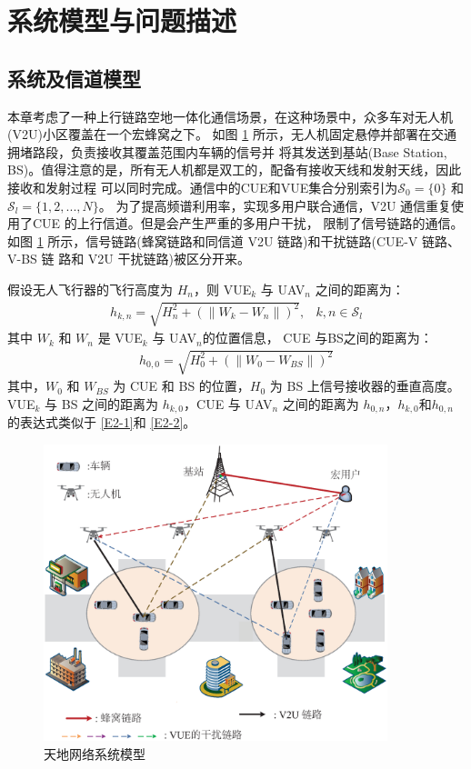 \section{系统模型与问题描述}\label{section2-2}
\subsection{系统及信道模型}\label{section2-2-1}
本章考虑了一种上行链路空地一体化通信场景，在这种场景中，众多车对无人机(V2U)小区覆盖在一个宏蜂窝之下。
如图 \ref{天地网络系统模型} 所示，无人机固定悬停并部署在交通拥堵路段，负责接收其覆盖范围内车辆的信号并
将其发送到基站(Base Station, BS)。值得注意的是，所有无人机都是双工的，配备有接收天线和发射天线，因此接收和发射过程
可以同时完成。通信中的CUE和VUE集合分别索引为$\mathcal{S}_0= \{0\}$ 和$\mathcal{S}_l=\{1, 2,..., N\}$。
为了提高频谱利用率，实现多用户联合通信，V2U 通信重复使用了CUE 的上行信道。但是会产生严重的多用户干扰，
限制了信号链路的通信。如图 \ref{天地网络系统模型} 所示，信号链路(蜂窝链路和同信道 V2U 链路)和干扰链路(CUE-V 链路、V-BS 链
路和 V2U 干扰链路)被区分开来。

假设无人飞行器的飞行高度为 $H_n$，则 VUE$_{k}$ 与 UAV$_{n}$ 之间的距离为：
\begin{eqnarray}\label{E2-1}
h_{k,n}=\sqrt{H_n^2+(\|W_k-W_n\|)^2},           &k, n\in \mathcal{S}_l
\end{eqnarray}
其中 $W_k$ 和 $W_n$ 是 VUE$_{k}$ 与 UAV$_{n}$的位置信息，  CUE 与BS之间的距离为：
\begin{eqnarray}\label{E2-2}
h_{0,0}=\sqrt{H_0^2+(\|W_0-W_{BS}\|)^2}
\end{eqnarray}
其中，$W_0$ 和 $W_{BS}$ 为 CUE 和 BS 的位置，$H_0$ 为 BS 上信号接收器的垂直高度。VUE$_{k}$ 与 BS 之间的距离为 $h_{k,0}$，CUE 与 UAV$_{n}$ 之间的距离为 $h_{0,n}$，$h_{k,0}$和$h_{0,n}$的表达式类似于 \eqref{E2-1}和 \eqref{E2-2}。

\begin{figure}[H]
\centering
\includegraphics[width=10cm]{figures//chap2//第二章系统模型.eps}
\caption{天地网络系统模型}
\label{天地网络系统模型}
\end{figure}

